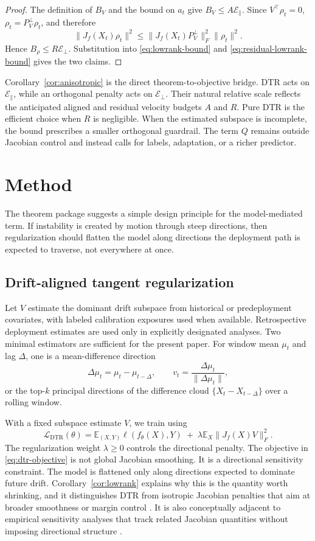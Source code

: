 \documentclass[conference]{IEEEtran}
\newcommand{\E}{\mathbb{E}}
\begin{document}
\begin{proof}
The definition of $B_V$ and the bound on $a_t$ give
$B_V\le A\mathcal E_\parallel$. Since $V^\top\rho_t=0$,
$\rho_t=P_V^\perp\rho_t$, and therefore
\[
\|J_f(X_t)\rho_t\|^2
\le
\|J_f(X_t)P_V^\perp\|_F^2\|\rho_t\|^2.
\]
Hence $B_\rho\le R\mathcal E_\perp$. Substitution into
\eqref{eq:lowrank-bound} and \eqref{eq:residual-lowrank-bound} gives the two claims.
\end{proof}

Corollary~\ref{cor:anisotropic} is the direct theorem-to-objective bridge. DTR acts on $\mathcal E_\parallel$, while an orthogonal penalty acts on $\mathcal E_\perp$. Their natural relative scale reflects the anticipated aligned and residual velocity budgets $A$ and $R$. Pure DTR is the efficient choice when $R$ is negligible. When the estimated subspace is incomplete, the bound prescribes a smaller orthogonal guardrail. The term $Q$ remains outside Jacobian control and instead calls for labels, adaptation, or a richer predictor.

\section{Method}
The theorem package suggests a simple design principle for the model-mediated term. If instability is created by motion through steep directions, then regularization should flatten the model along directions the deployment path is expected to traverse, not everywhere at once.

\subsection{Drift-aligned tangent regularization}
Let $V$ estimate the dominant drift subspace from historical or predeployment covariates, with labeled calibration exposures used when available. Retrospective deployment estimates are used only in explicitly designated analyses. Two minimal estimators are sufficient for the present paper. For window mean $\mu_t$ and lag $\Delta$, one is a mean-difference direction
\[
\Delta\mu_t=\mu_t-\mu_{t-\Delta},
\qquad
v_t=\frac{\Delta\mu_t}{\|\Delta\mu_t\|},
\]
or the top-$k$ principal directions of the difference cloud $\{X_t-X_{t-\Delta}\}$ over a rolling window.

With a fixed subspace estimate $V$, we train using
\begin{equation}
\label{eq:dtr-objective}
\mathcal L_{\mathrm{DTR}}(\theta)
=
\E_{(X,Y)}\ell(f_\theta(X),Y)
\;+\;
\lambda\E_X\|J_f(X)V\|_F^2.
\end{equation}
The regularization weight $\lambda\geq0$ controls the directional penalty. The objective in \eqref{eq:dtr-objective} is not global Jacobian smoothing. It is a directional sensitivity constraint. The model is flattened only along directions expected to dominate future drift. Corollary~\ref{cor:lowrank} explains why this is the quantity worth shrinking, and it distinguishes DTR from isotropic Jacobian penalties that aim at broader smoothness or margin control \cite{sokolic-jacobian,kim-jacobian}. It is also conceptually adjacent to empirical sensitivity analyses that track related Jacobian quantities without imposing directional structure \cite{novak-sensitivity}.
\end{document}
